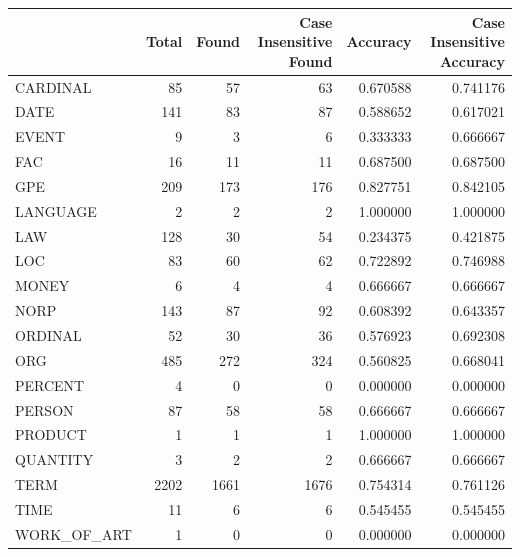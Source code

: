 \begin{tabular}{lrrrrr}
\toprule
 & Total & Found & Case Insensitive Found & Accuracy & Case Insensitive Accuracy \\
\midrule
CARDINAL & 85 & 57 & 63 & 0.670588 & 0.741176 \\
DATE & 141 & 83 & 87 & 0.588652 & 0.617021 \\
EVENT & 9 & 3 & 6 & 0.333333 & 0.666667 \\
FAC & 16 & 11 & 11 & 0.687500 & 0.687500 \\
GPE & 209 & 173 & 176 & 0.827751 & 0.842105 \\
LANGUAGE & 2 & 2 & 2 & 1.000000 & 1.000000 \\
LAW & 128 & 30 & 54 & 0.234375 & 0.421875 \\
LOC & 83 & 60 & 62 & 0.722892 & 0.746988 \\
MONEY & 6 & 4 & 4 & 0.666667 & 0.666667 \\
NORP & 143 & 87 & 92 & 0.608392 & 0.643357 \\
ORDINAL & 52 & 30 & 36 & 0.576923 & 0.692308 \\
ORG & 485 & 272 & 324 & 0.560825 & 0.668041 \\
PERCENT & 4 & 0 & 0 & 0.000000 & 0.000000 \\
PERSON & 87 & 58 & 58 & 0.666667 & 0.666667 \\
PRODUCT & 1 & 1 & 1 & 1.000000 & 1.000000 \\
QUANTITY & 3 & 2 & 2 & 0.666667 & 0.666667 \\
TERM & 2202 & 1661 & 1676 & 0.754314 & 0.761126 \\
TIME & 11 & 6 & 6 & 0.545455 & 0.545455 \\
WORK_OF_ART & 1 & 0 & 0 & 0.000000 & 0.000000 \\
\bottomrule
\end{tabular}
